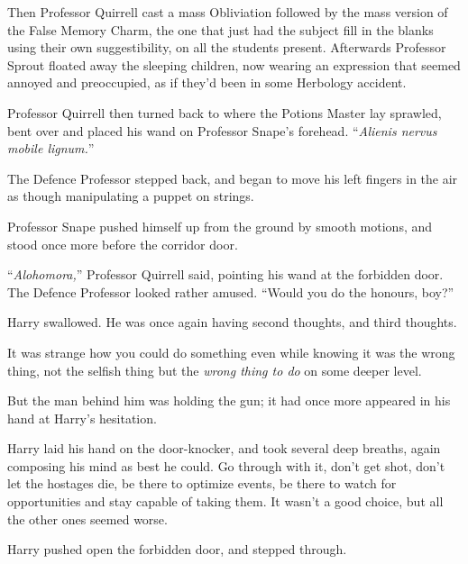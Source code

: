 Then Professor Quirrell cast a mass Obliviation followed by the mass version of the False Memory Charm, the one that just had the subject fill in the blanks using their own suggestibility, on all the students present. Afterwards Professor Sprout floated away the sleeping children, now wearing an expression that seemed annoyed and preoccupied, as if they’d been in some Herbology accident.

Professor Quirrell then turned back to where the Potions Master lay sprawled, bent over and placed his wand on Professor Snape’s forehead. “\emph{Alienis nervus mobile lignum.}”

The Defence Professor stepped back, and began to move his left fingers in the air as though manipulating a puppet on strings.

Professor Snape pushed himself up from the ground by smooth motions, and stood once more before the corridor door.

“\emph{Alohomora,}” Professor Quirrell said, pointing his wand at the forbidden door. The Defence Professor looked rather amused. “Would you do the honours, boy?”

Harry swallowed. He was once again having second thoughts, and third thoughts.

It was strange how you could do something even while knowing it was the wrong thing, not the selfish thing but the \emph{wrong thing to do} on some deeper level.

But the man behind him was holding the gun; it had once more appeared in his hand at Harry’s hesitation.

Harry laid his hand on the door-knocker, and took several deep breaths, again composing his mind as best he could. Go through with it, don’t get shot, don’t let the hostages die, be there to optimize events, be there to watch for opportunities and stay capable of taking them. It wasn’t a good choice, but all the other ones seemed worse.

Harry pushed open the forbidden door, and stepped through.

